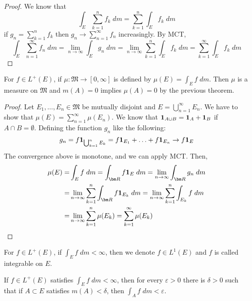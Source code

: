 \vspace{2ex}
\begin{proof}
We know that
\[\int _{E}\sum ^{n}_{k=1}f_{k}\;d m=\sum ^{n}_{k=1}\int _{E}f_{k}\;d m\]
if $g_{n}=\sum ^{n}_{k=1}f_{k}$ then $g_{n}\rightarrow \sum ^{\infty }_{n=1}f_{n}$ increasingly. By MCT,
\[\int _{E}\sum ^{\infty }_{n=1}f_{n}\;d m=\lim _{n\rightarrow \infty }\int _{E}g_{n}\;d m=\lim _{n\rightarrow \infty }\sum ^{n}_{k=1}\int _{E}f_{k}\;d m
=\sum ^{\infty }_{k=1}\int _{E}f_{k}\;d m
\]
\end{proof}
\vspace{2ex}
\begin{thm}
For $f\in L^{+}(E)$, if $\mu :\mathfrak{M}\rightarrow [0,\infty ]$ is defined by $\mu (E)=\int _{E}f\; d m$. Then $\mu $ is a measure on $\mathfrak{M}$ and $m(A)=0$ implies $\mu (A)=0$ by the previous theorem.
\end{thm}
\vspace{2ex}
\begin{proof}
Let $E_1,\ldots,E_{n}\in \mathfrak{M}$ be mutually disjoint and $E=\bigcup ^{\infty }_{n=1}E_{n}$. We have to show that $\mu (E)=\sum _{n=1}^{\infty }\mu (E_{n})$. We know that ${\bf 1}_{A\cup B}={\bf 1}_{A}+{\bf 1}_{B}$ if $A\cap B=\emptyset$. Defining the function $g_{n}$ like the following: 
\[g_{n}=f{\bf 1}_{\bigcup ^{n}_{k=1}E_{k}}=f{\bf 1}_{E_{1}}+\ldots +f{\bf 1}_{E_{n}}\rightarrow f{\bf 1}_{E}\]
The convergence above is monotone, and we can apply MCT. Then,
\begin{align*}
\mu (E)=&\int _{E}f\; dm=\int _{{\bm R}}f{\bf 1}_{E}\; d m=\lim_{n\rightarrow \infty }\int _{{\bm R}}g_{n}\; dm\\
=&\lim _{n\rightarrow \infty }\sum ^{n}_{k=1}\int _{{\bm R}}f{\bf 1}_{E_{k}}\;d m=\lim _{n\rightarrow \infty }\sum ^{n}_{k=1}\int _{E_{k}}f\;d m\\
=&\lim_{n\rightarrow \infty}\sum ^{n }_{k=1}\mu (E_{k})=\sum ^{\infty }_{k=1}\mu (E_{k})
\end{align*}
\end{proof}
\vspace{2ex}
\begin{defi}
For $f\in L^{+}(E)$, if $\int _{E}f\; dm<\infty $, then we denote $f\in L^{1}(E)$ and $f$ is called integrable on $E$. 
\end{defi}
\vspace{2ex}
\begin{thm}
If $f\in L^{+}(E)$ satisfies $\int _{E}f\; dm<\infty $, then for every $\varepsilon >0$ there is $\delta >0$ such that if $A\subset E$ satisfies $m(A)<\delta $, then $\int _{A}f\;d m<\varepsilon $. 
\end{thm}
